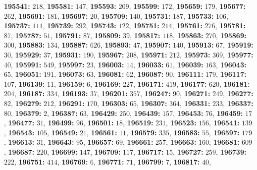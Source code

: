 \textsf{\bfseries 195541:} $218$, \textsf{\bfseries 195581:} $147$, \textsf{\bfseries 195593:} $209$, \textsf{\bfseries 195599:} $172$, \textsf{\bfseries 195659:} $179$, \textsf{\bfseries 195677:} $262$, \textsf{\bfseries 195691:} $181$, \textsf{\bfseries 195697:} $20$, \textsf{\bfseries 195709:} $140$, \textsf{\bfseries 195731:} $187$, \textsf{\bfseries 195733:} $106$, \textsf{\bfseries 195737:} $111$, \textsf{\bfseries 195739:} $292$, \textsf{\bfseries 195743:} $122$, \textsf{\bfseries 195751:} $214$, \textsf{\bfseries 195761:} $276$, \textsf{\bfseries 195781:} $87$, \textsf{\bfseries 195787:} $51$, \textsf{\bfseries 195791:} $87$, \textsf{\bfseries 195809:} $39$, \textsf{\bfseries 195817:} $118$, \textsf{\bfseries 195863:} $270$, \textsf{\bfseries 195869:} $300$, \textsf{\bfseries 195883:} $134$, \textsf{\bfseries 195887:} $626$, \textsf{\bfseries 195893:} $47$, \textsf{\bfseries 195907:} $140$, \textsf{\bfseries 195913:} $67$, \textsf{\bfseries 195919:} $30$, \textsf{\bfseries 195929:} $37$, \textsf{\bfseries 195931:} $190$, \textsf{\bfseries 195967:} $208$, \textsf{\bfseries 195971:} $212$, \textsf{\bfseries 195973:} $369$, \textsf{\bfseries 195977:} $40$, \textsf{\bfseries 195991:} $549$, \textsf{\bfseries 195997:} $23$, \textsf{\bfseries 196003:} $14$, \textsf{\bfseries 196033:} $61$, \textsf{\bfseries 196039:} $163$, \textsf{\bfseries 196043:} $65$, \textsf{\bfseries 196051:} $191$, \textsf{\bfseries 196073:} $63$, \textsf{\bfseries 196081:} $62$, \textsf{\bfseries 196087:} $90$, \textsf{\bfseries 196111:} $179$, \textsf{\bfseries 196117:} $107$, \textsf{\bfseries 196139:} $11$, \textsf{\bfseries 196159:} $6$, \textsf{\bfseries 196169:} $227$, \textsf{\bfseries 196171:} $419$, \textsf{\bfseries 196177:} $620$, \textsf{\bfseries 196181:} $204$, \textsf{\bfseries 196187:} $334$, \textsf{\bfseries 196193:} $37$, \textsf{\bfseries 196201:} $357$, \textsf{\bfseries 196247:} $90$, \textsf{\bfseries 196271:} $249$, \textsf{\bfseries 196277:} $82$, \textsf{\bfseries 196279:} $212$, \textsf{\bfseries 196291:} $170$, \textsf{\bfseries 196303:} $65$, \textsf{\bfseries 196307:} $364$, \textsf{\bfseries 196331:} $233$, \textsf{\bfseries 196337:} $80$, \textsf{\bfseries 196379:} $2$, \textsf{\bfseries 196387:} $63$, \textsf{\bfseries 196429:} $250$, \textsf{\bfseries 196439:} $157$, \textsf{\bfseries 196453:} $76$, \textsf{\bfseries 196459:} $17$, \textsf{\bfseries 196477:} $31$, \textsf{\bfseries 196499:} $96$, \textsf{\bfseries 196501:} $18$, \textsf{\bfseries 196519:} $231$, \textsf{\bfseries 196523:} $156$, \textsf{\bfseries 196541:} $139$, \textsf{\bfseries 196543:} $105$, \textsf{\bfseries 196549:} $21$, \textsf{\bfseries 196561:} $11$, \textsf{\bfseries 196579:} $335$, \textsf{\bfseries 196583:} $55$, \textsf{\bfseries 196597:} $179$, \textsf{\bfseries 196613:} $31$, \textsf{\bfseries 196643:} $95$, \textsf{\bfseries 196657:} $69$, \textsf{\bfseries 196661:} $257$, \textsf{\bfseries 196663:} $160$, \textsf{\bfseries 196681:} $609$, \textsf{\bfseries 196687:} $220$, \textsf{\bfseries 196699:} $147$, \textsf{\bfseries 196709:} $117$, \textsf{\bfseries 196717:} $15$, \textsf{\bfseries 196727:} $259$, \textsf{\bfseries 196739:} $222$, \textsf{\bfseries 196751:} $414$, \textsf{\bfseries 196769:} $6$, \textsf{\bfseries 196771:} $71$, \textsf{\bfseries 196799:} $7$, \textsf{\bfseries 196817:} $40$, 
